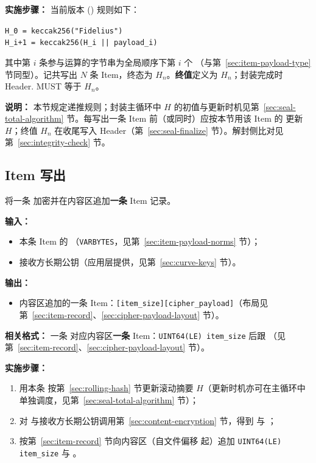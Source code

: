 \textbf{实施步骤：}
当前版本 () 规则如下：
\begin{center}
  \texttt{H\_0 = keccak256("Fidelius")} \\
  \texttt{H\_{i+1} = keccak256(H\_i || payload\_i)}
\end{center}
其中第 $i$ 条参与运算的字节串为全局顺序下第 $i$ 个 （与第~\ref{sec:item-payload-type} 节同型）。记共写出 $N$ 条 Item，终态为 $H_n$。\textbf{\rollhash 终值}\label{sec:rolling-hash-final}定义为 $H_n$；封装完成时 Header. MUST 等于 $H_n$。

\textbf{说明：}
本节规定递推规则；封装主循环中 $H$ 的初值与更新时机见第~\ref{sec:seal-total-algorithm} 节。每写出一条 Item 前（或同时）应按本节用该 Item 的  更新 $H$；终值 $H_n$ 在收尾写入 Header（第~\ref{sec:seal-finalize} 节）。解封侧比对见第~\ref{sec:integrity-check} 节。

\subsection{Item 写出}\label{sec:item-generation}
将一条  加密并在内容区追加\textbf{一条} Item 记录。

\textbf{输入：}
\begin{itemize}
  \item 本条 Item 的 （\texttt{VARBYTES}，见第~\ref{sec:item-payload-norms} 节）；
  \item 接收方长期公钥（应用层提供，见第~\ref{sec:curve-keys} 节）。
\end{itemize}

\textbf{输出：}
\begin{itemize}
  \item 内容区追加的一条 Item：\texttt{[item\_size][cipher\_payload]}（布局见第~\ref{sec:item-record}、\ref{sec:cipher-payload-layout} 节）。
\end{itemize}

\textbf{相关格式：}
一条  对应内容区\textbf{一条} Item：\texttt{UINT64(LE) item\_size} 后跟 （见第~\ref{sec:item-record}、\ref{sec:cipher-payload-layout} 节）。

\textbf{实施步骤：}
\begin{enumerate}
  \item 用本条  按第~\ref{sec:rolling-hash} 节更新滚动摘要 $H$（更新时机亦可在主循环中单独调度，见第~\ref{sec:seal-total-algorithm} 节）；
  \item 对  与接收方长期公钥调用第~\ref{sec:content-encryption} 节，得到  与 ；
  \item 按第~\ref{sec:item-record} 节向内容区（自文件偏移  起）追加 \texttt{UINT64(LE) item\_size} 与 。
\end{enumerate}

